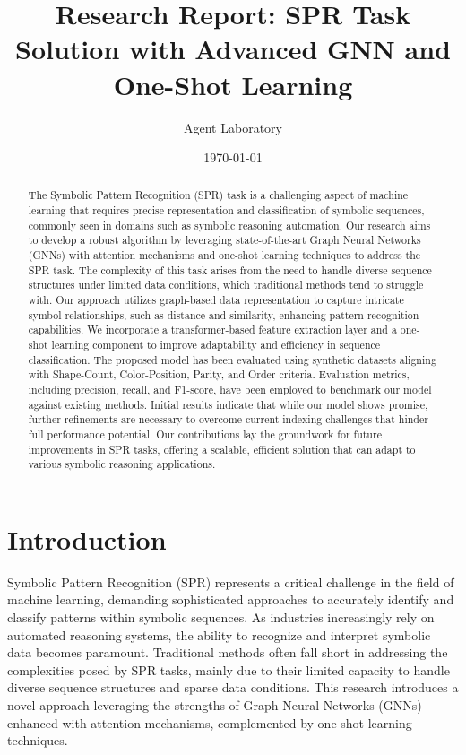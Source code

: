 \documentclass{article}
\title{Research Report: SPR Task Solution with Advanced GNN and One-Shot Learning}
\author{Agent Laboratory}
\date{\today}
\begin{document}
\maketitle

\begin{abstract}
The Symbolic Pattern Recognition (SPR) task is a challenging aspect of machine learning that requires precise representation and classification of symbolic sequences, commonly seen in domains such as symbolic reasoning automation. Our research aims to develop a robust algorithm by leveraging state-of-the-art Graph Neural Networks (GNNs) with attention mechanisms and one-shot learning techniques to address the SPR task. The complexity of this task arises from the need to handle diverse sequence structures under limited data conditions, which traditional methods tend to struggle with. Our approach utilizes graph-based data representation to capture intricate symbol relationships, such as distance and similarity, enhancing pattern recognition capabilities. We incorporate a transformer-based feature extraction layer and a one-shot learning component to improve adaptability and efficiency in sequence classification. The proposed model has been evaluated using synthetic datasets aligning with Shape-Count, Color-Position, Parity, and Order criteria. Evaluation metrics, including precision, recall, and F1-score, have been employed to benchmark our model against existing methods. Initial results indicate that while our model shows promise, further refinements are necessary to overcome current indexing challenges that hinder full performance potential. Our contributions lay the groundwork for future improvements in SPR tasks, offering a scalable, efficient solution that can adapt to various symbolic reasoning applications.
\end{abstract}

\section{Introduction}
Symbolic Pattern Recognition (SPR) represents a critical challenge in the field of machine learning, demanding sophisticated approaches to accurately identify and classify patterns within symbolic sequences. As industries increasingly rely on automated reasoning systems, the ability to recognize and interpret symbolic data becomes paramount. Traditional methods often fall short in addressing the complexities posed by SPR tasks, mainly due to their limited capacity to handle diverse sequence structures and sparse data conditions. This research introduces a novel approach leveraging the strengths of Graph Neural Networks (GNNs) enhanced with attention mechanisms, complemented by one-shot learning techniques. 
\end{document}
